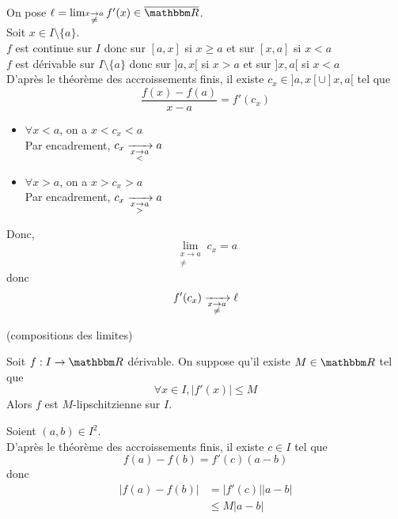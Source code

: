 \begin{prv}
	On pose $\ell = \lim_{\substack{x \to a\\\neq}} f'(x) \in \overline{\R}$.\\
	Soit $x \in I\setminus \{a\}$.\\
	$f$ est continue sur $I$ donc sur $[a,x]$ si $x \ge a$ et sur $[x,a]$ si $x < a$ \\
	$f$ est dérivable sur $I\setminus \{a\}$ donc sur $]a,x[$ si $x >a$ et sur $]x,a[$ si $x<a$ \\
	D'après le théorème des accroissements finis, il existe $c_x \in ]a,x[ \cup ]x,a[$ tel que
	\[
		\frac{f(x) - f(a)}{x-a} = f'(c_x)
	\]
	\begin{itemize}
		\item $\forall x < a$, on a $x < c_x < a$ \\ Par encadrement, $c_x \xrightarrow[\substack{x \to a\\<}]{} a$
		\item $\forall x > a$, on a $x > c_x > a$ \\ Par encadrement, $c_x \xrightarrow[\substack{x \to a\\>}]{} a$
	\end{itemize}
	Donc, \[
		\lim_{\substack{x \to a\\\neq}} c_x = a
	\] donc \[
		f'(c_x) \xrightarrow[\substack{x \to a\\\neq}]{} \ell
	\] 
	\begin{center}
		(compositions des limites)
	\end{center}
\end{prv}

\begin{prop}
	Soit $f: I \to \R$ dérivable. On suppose qu'il existe $M \in \R$ tel que \[
		\forall x \in I, \left| f'(x)\right| \le M 
	\] Alors $f$ est $M$-lipschitzienne sur $I$.
\end{prop}

\begin{prv}
	Soient $(a,b) \in I^2$.\\
	D'après le théorème des accroissements finis, il existe $c \in I$ tel que \[
		f(a) - f(b) = f'(c) (a-b)
	\] donc
	\begin{align*}
		\left| f(a)-f(b) \right| &= \left| f'(c) \right| \left| a-b \right| \\
														 &\le M \left| a-b \right| 
	\end{align*}
\end{prv}
